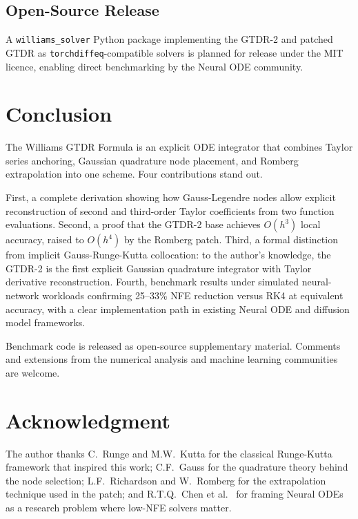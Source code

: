 \documentclass[conference]{IEEEtran}
\begin{document}
\subsection{Open-Source Release}

A \texttt{williams\_solver} Python package implementing the GTDR-2 and
patched GTDR as \texttt{torchdiffeq}-compatible solvers is planned for
release under the MIT licence, enabling direct benchmarking by the Neural
ODE community.

\section{Conclusion}
\label{sec:conclusion}

The Williams GTDR Formula is an explicit ODE integrator that combines
Taylor series anchoring, Gaussian quadrature node placement, and Romberg
extrapolation into one scheme. Four contributions stand out.

First, a complete derivation showing how Gauss-Legendre nodes allow
explicit reconstruction of second and third-order Taylor coefficients
from two function evaluations. Second, a proof that the GTDR-2 base
achieves $O(h^3)$ local accuracy, raised to $O(h^4)$ by the Romberg
patch. Third, a formal distinction from implicit Gauss-Runge-Kutta
collocation: to the author's knowledge, the GTDR-2 is the first explicit
Gaussian quadrature integrator with Taylor derivative reconstruction.
Fourth, benchmark results under simulated neural-network workloads
confirming 25--33\% NFE reduction versus RK4 at equivalent accuracy,
with a clear implementation path in existing Neural ODE and diffusion
model frameworks.

Benchmark code is released as open-source supplementary material.
Comments and extensions from the numerical analysis and machine learning
communities are welcome.

\section*{Acknowledgment}

The author thanks C.~Runge and M.W.~Kutta \cite{runge1895,kutta1901}
for the classical Runge-Kutta framework that inspired this work;
C.F.~Gauss \cite{gauss1814} for the quadrature theory behind the node
selection; L.F.~Richardson \cite{richardson1911} and W.~Romberg
\cite{romberg1955} for the extrapolation technique used in the patch;
and R.T.Q.~Chen et al.\ \cite{chen2018neuralode} for framing Neural ODEs
as a research problem where low-NFE solvers matter.
\end{document}
